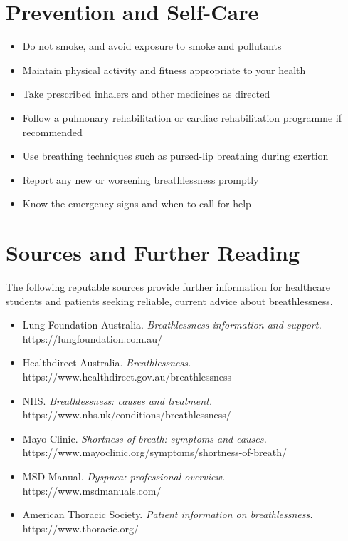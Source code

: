 \section*{Prevention and Self-Care}
\begin{itemize}
    \item Do not smoke, and avoid exposure to smoke and pollutants
    \item Maintain physical activity and fitness appropriate to your health
    \item Take prescribed inhalers and other medicines as directed
    \item Follow a pulmonary rehabilitation or cardiac rehabilitation programme if recommended
    \item Use breathing techniques such as pursed-lip breathing during exertion
    \item Report any new or worsening breathlessness promptly
    \item Know the emergency signs and when to call for help
\end{itemize}

\section*{Sources and Further Reading}
The following reputable sources provide further information for healthcare students and patients seeking reliable, current advice about breathlessness.
\begin{itemize}
    \item Lung Foundation Australia. \textit{Breathlessness information and support.} https://lungfoundation.com.au/
    \item Healthdirect Australia. \textit{Breathlessness.} https://www.healthdirect.gov.au/breathlessness
    \item NHS. \textit{Breathlessness: causes and treatment.} https://www.nhs.uk/conditions/breathlessness/
    \item Mayo Clinic. \textit{Shortness of breath: symptoms and causes.} https://www.mayoclinic.org/symptoms/shortness-of-breath/
    \item MSD Manual. \textit{Dyspnea: professional overview.} https://www.msdmanuals.com/
    \item American Thoracic Society. \textit{Patient information on breathlessness.} https://www.thoracic.org/
\end{itemize}
